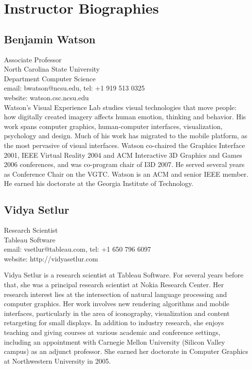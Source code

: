\documentclass{sigchi-ext}
\begin{document}
\balance

\nocite{*}


\newpage

\section{Instructor Biographies}
\subsection{Benjamin Watson}
Associate Professor\\
North Carolina State University\\
Department Computer Science\\
email: bwatson@ncsu.edu, tel: +1 919 513 0325\\
website: watson.csc.ncsu.edu\\
\vspace{2mm}
Watson's Visual Experience Lab studies visual technologies that move people: how digitally created imagery affects human emotion, thinking and behavior. His work spans computer graphics, human-computer interfaces, visualization, psychology and design. Much of his work has migrated to the mobile platform, as the most pervasive of visual interfaces. Watson co-chaired the Graphics Interface 2001, IEEE Virtual Reality 2004 and ACM Interactive 3D Graphics and Games 2006 conferences, and was co-program chair of I3D 2007. He served several years as Conference Chair on the VGTC. Watson is an ACM and senior IEEE member. He earned his doctorate at the Georgia Institute of Technology. 

\subsection{Vidya Setlur}
Research Scientist\\
Tableau Software\\
email: vsetlur@tableau.com, tel: +1 650 796 6097\\
website: http://vidyasetlur.com\\
\vspace{2mm}

Vidya Setlur is a research scientist at Tableau Software. For several years before that, she was a principal research scientist at Nokia Research Center. Her research interest lies at the intersection of natural language processing and computer graphics. Her work involves new rendering algorithms and mobile interfaces, particularly in the area of iconography, visualization and content retargeting for small displays. In addition to industry research, she enjoys teaching and giving courses at various academic and conference settings, including an appointment with Carnegie Mellon University (Silicon Valley campus) as an adjunct professor. She earned her doctorate in Computer Graphics at Northwestern University in 2005. 

\end{document}
